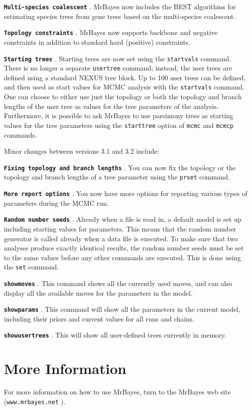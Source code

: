 \documentclass[12pt]{book}
\newcommand{\ttt}[1]{\texttt{#1} }
\newcommand{\tb}[1]{\ttt{\textbf{#1}} }
\begin{document}
\tb{Multi-species coalescent}. MrBayes now includes the BEST algorithms for estimating species
trees from gene trees based on the multi-species coalescent.

\tb{Topology constraints}. MrBayes now supports backbone and negative constraints in addition to
standard hard (positive) constraints.

\tb{Starting trees}. Starting trees are now set using the \ttt{startvals} command. There is no
longer a separate \ttt{usertree} command; instead, the user trees are defined using a standard
NEXUS tree block. Up to 100 user trees can be defined, and then used as start values for MCMC
analysis with the \ttt{startvals} command. One can choose to either use just the topology or both
the topology and branch lengths of the user tree as values for the tree parameters of the analysis.
Furthermore, it is possible to ask MrBayes to use parsimony trees as starting values for the tree
parameters using the \ttt{starttree} option of \ttt{mcmc} and \ttt{mcmcp} commands.

Minor changes between versions 3.1 and 3.2 include:

\tb{Fixing topology and branch lengths}. You can now fix the topology or the topology and branch
lengths of a tree parameter using the \ttt{prset} command.

\tb{More report options}. You now have more options for reporting various types of parameters
during the MCMC run.

\tb{Random number seeds}. Already when a file is read in, a default model is set up including
starting values for parameters. This means that the random number generator is called already when
a data file is executed. To make sure that two analyses produce exactly identical results, the
random number seeds must be set to the same values before any other commands are executed. This is
done using the \ttt{set} command.

\tb{showmoves}. This command shows all the currently used moves, and can also display all the
available moves for the parameters in the model.

\tb{showparams}. This command will show all the parameters in the current model, including their
priors and current values for all runs and chains.

\tb{showusertrees}. This will show all user-defined trees currently in memory.

\section{More Information}
For more information on how to use MrBayes, turn to the MrBayes web site
(\ttt{www.mrbayes.net}).
\end{document}
